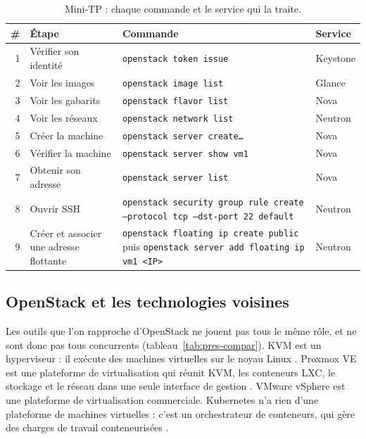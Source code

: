 \begin{table}[!ht]
\centering
\renewcommand{\arraystretch}{1.2}
\begin{tabular}{@{}r>{\raggedright\arraybackslash}p{4.1cm}>{\raggedright\arraybackslash}p{7.0cm}>{\raggedright\arraybackslash}p{2.7cm}@{}}
\toprule
\textbf{\#} & \textbf{Étape} & \textbf{Commande} & \textbf{Service} \\
\midrule
1 & Vérifier son identité & \texttt{openstack token issue} & Keystone \\
2 & Voir les images & \texttt{openstack image list} & Glance \\
3 & Voir les gabarits & \texttt{openstack flavor list} & Nova \\
4 & Voir les réseaux & \texttt{openstack network list} & Neutron \\
5 & Créer la machine & \texttt{openstack server create\dots} & Nova \\
6 & Vérifier la machine & \texttt{openstack server show vm1} & Nova \\
7 & Obtenir son adresse & \texttt{openstack server list} & Nova \\
8 & Ouvrir SSH & \texttt{openstack security group rule create --protocol tcp --dst-port 22 default} & Neutron \\
9 & Créer et associer une adresse flottante & \texttt{openstack floating ip create public} puis
  \texttt{openstack server add floating ip vm1 <IP>} & Neutron \\
\bottomrule
\end{tabular}
\caption{Mini-TP : chaque commande et le service qui la traite.}
\label{tab:pres-tp}
\end{table}

\subsection{OpenStack et les technologies voisines}\label{sec:pres-comparaison}

Les outils que l'on rapproche d'OpenStack ne jouent pas tous le même rôle, et ne sont donc pas tous concurrents
(tableau~\ref{tab:pres-compar}). KVM est un hyperviseur : il exécute des machines virtuelles sur le noyau Linux
\parencite{kvm}. Proxmox VE est une plateforme de virtualisation qui réunit KVM, les conteneurs LXC, le stockage et le réseau
dans une seule interface de gestion \parencite{proxmox}. VMware vSphere est une plateforme de virtualisation commerciale. Kubernetes n'a rien d'une plateforme de machines virtuelles : c'est un orchestrateur de conteneurs, qui gère des
charges de travail conteneurisées \parencite{kubernetes-overview}.

